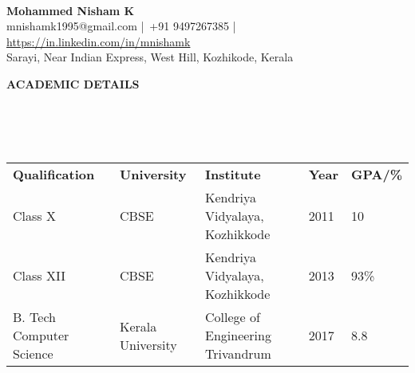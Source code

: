 \documentclass[a4paper,10pt]{article}
\newcommand{\lsep}{-0.5cm}
\newcommand{\resheading}[1]{{\small \colorbox{mygrey}{\begin{minipage}{0.975\textwidth}{\textbf{\uppercase{#1} \vphantom{p\^{E}}}}\end{minipage}}}}
\begin{document}
\hspace{0.5cm}\\[-0.2cm]

\begin{center}
\textbf{\Large{Mohammed Nisham K}} \\
mnishamk1995@gmail.com |\, +91 9497267385 |\, \href{https://in.linkedin.com/in/mnishamk}{https://in.linkedin.com/in/mnishamk}\\
Sarayi, Near Indian Express, West Hill, Kozhikode, Kerala \\
\end{center}

\resheading{\textbf{ACADEMIC DETAILS} }\\[\lsep]
\\ \\
\indent \begin{tabular}{ l @{\hskip 0.15in} l @{\hskip 0.15in} l @{\hskip 0.15in} l @{\hskip 0.15in} l }
\textbf{Qualification} & \textbf{University} & \textbf{Institute} & \textbf{Year} & \textbf{GPA/\%} \\
Class X & CBSE & Kendriya Vidyalaya, Kozhikkode & 2011 & 10 \\
Class XII & CBSE & Kendriya Vidyalaya, Kozhikkode & 2013 & 93\% \\
B. Tech Computer Science & Kerala University & College of Engineering Trivandrum & 2017 & 8.8\\
\end{tabular}
\\ \\
\end{document}

